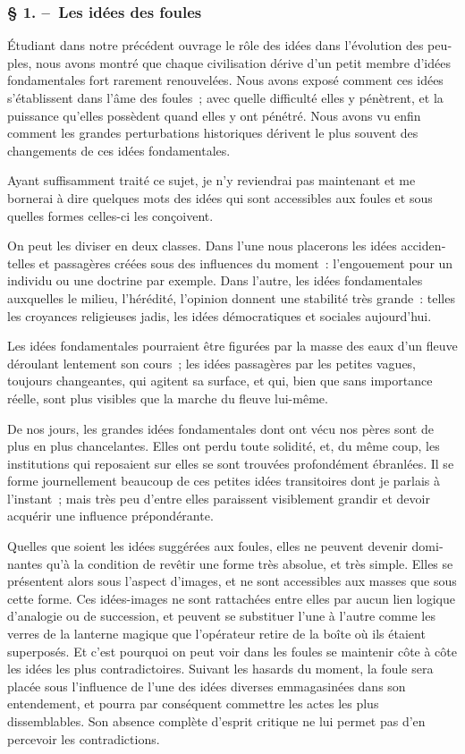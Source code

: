 \documentclass[french,twoside]{book} %
\begin{document}
\subsubsection[{§ 1. – Les idées des foules}]{§ 1. – Les idées des foules}
\noindent Étudiant dans notre précédent ouvrage le rôle des idées dans l’évolution des peu­ples, nous avons montré que chaque civilisation dérive d’un petit membre d’idées fondamentales fort rarement renouvelées. Nous avons exposé comment ces idées s’établissent dans l’âme des foules ; avec quelle difficulté elles y pénètrent, et la puissance qu’elles possèdent quand elles y ont pénétré. Nous avons vu enfin comment les grandes perturbations historiques dérivent le plus souvent des changements de ces idées fondamentales.\par
Ayant suffisamment traité ce sujet, je n’y reviendrai pas maintenant et me bornerai à dire quelques mots des idées qui sont accessibles aux foules et sous quelles formes celles-ci les conçoivent.\par
On peut les diviser en deux classes. Dans l’une nous placerons les idées acciden­telles et passagères créées sous des influences du moment : l’engouement pour un individu ou une doctrine par exemple. Dans l’autre, les idées fondamentales auxquel­les le milieu, l’hérédité, l’opinion donnent une stabilité très grande : telles les croyan­ces religieuses jadis, les idées démocratiques et sociales aujourd’hui.\par
Les idées fondamentales pourraient être figurées par la masse des eaux d’un fleuve déroulant lentement son cours ; les idées passagères par les petites vagues, toujours changeantes, qui agitent sa surface, et qui, bien que sans importance réelle, sont plus visibles que la marche du fleuve lui-même.\par
De nos jours, les grandes idées fondamentales dont ont vécu nos pères sont de plus en plus chancelantes. Elles ont perdu toute solidité, et, du même coup, les institu­tions qui reposaient sur elles se sont trouvées profondément ébranlées. Il se forme journellement beaucoup de ces petites idées transitoires dont je parlais à l’instant ; mais très peu d’entre elles paraissent visible­ment grandir et devoir acquérir une influence prépondérante.\par
Quelles que soient les idées suggérées aux foules, elles ne peuvent devenir domi­nantes qu’à la condition de revêtir une forme très absolue, et très simple. Elles se présentent alors sous l’aspect d’images, et ne sont accessibles aux masses que sous cette forme. Ces idées-images ne sont rattachées entre elles par aucun lien logique d’analogie ou de succession, et peuvent se substituer l’une à l’autre comme les verres de la lanterne magique que l’opérateur retire de la boîte où ils étaient superposés. Et c’est pourquoi on peut voir dans les foules se maintenir côte à côte les idées les plus contradictoires. Suivant les hasards du moment, la foule sera placée sous l’influence de l’une des idées diverses emmagasinées dans son entendement, et pourra par conséquent commettre les actes les plus dissemblables. Son absence complète d’esprit critique ne lui permet pas d’en percevoir les contradictions.\par
\end{document}
